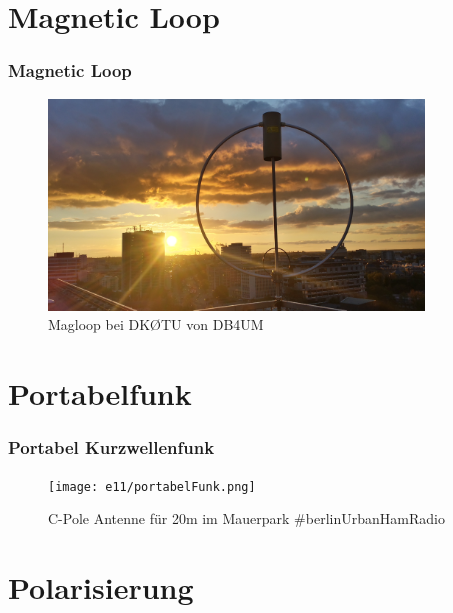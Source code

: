 \section*{Magnetic Loop}

\begin{frame}
  \frametitle{Magnetic Loop}
  \begin{center}
    \begin{figure}
      \includegraphics[width=0.89\textwidth,height=.75\textheight,keepaspectratio]{e11/Magloop.jpg}
      \caption{Magloop bei DK\O TU von DB4UM}
    \end{figure}
  \end{center}
\end{frame}

\section*{Portabelfunk}

\begin{frame}
  \frametitle{Portabel Kurzwellenfunk}
  \begin{center}
    \begin{figure}
      \texttt{[image: e11/portabelFunk.png]}
      \caption{C-Pole Antenne für 20m im Mauerpark \#berlinUrbanHamRadio}
    \end{figure}
  \end{center}
\end{frame}

\section*{Polarisierung}

